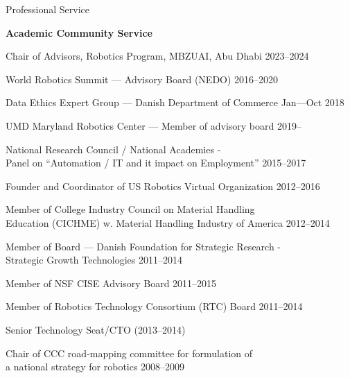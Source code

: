 \documentclass{article}
\newenvironment{sublist}{%
  \begin{list}{}{%
      \setlength{\itemsep}{0em}\setlength{\parsep}{0em}%
      \setlength{\topsep}{0em}\setlength{\parskip}{0em}%
    }%
}%
{ \end{list} }
\begin{document}
\begin{cv}


\begin{cvlist}{Professional Service}%
\item {\bf Academic Community Service}
  \begin{itemize}
    \item Chair of Advisors, Robotics Program, MBZUAI, Abu Dhabi
          \cftdotfill{\cftdotsep} 2023--2024
    \item World Robotics Summit --- Advisory Board (NEDO) \cftdotfill{\cftdotsep}
          2016--2020
    \item Data Ethics Expert Group --- Danish Department of Commerce
          \cftdotfill{\cftdotsep} Jan---Oct 2018
    \item UMD Maryland Robotics Center --- Member of advisory board
          \cftdotfill{\cftdotsep} 2019--
    \item National Research Council / National Academies -\\ Panel on ``Automation /
          IT and it impact on Employment'' \cftdotfill{\cftdotsep} 2015--2017
    \item Founder and Coordinator of US Robotics Virtual Organization
          \cftdotfill{\cftdotsep} 2012--2016
    \item Member of College Industry Council on Material Handling\\
          Education (CICHME) w. Material Handling Industry of America
          \cftdotfill{\cftdotsep} 2012--2014
    \item Member of Board --- Danish Foundation for Strategic Research -\\
          Strategic Growth Technologies \cftdotfill{\cftdotsep} 2011--2014
    \item Member of NSF CISE Advisory Board \cftdotfill{\cftdotsep} 2011--2015
    \item Member of Robotics Technology Consortium (RTC) Board
          \cftdotfill{\cftdotsep} 2011--2014
          \begin{sublist}
            \item Senior Technology Seat/CTO (2013--2014)
          \end{sublist}
    \item Chair of CCC road-mapping committee for formulation of \\
          a national strategy for robotics \cftdotfill{\cftdotsep} 2008--2009

\end{itemize}
\end{cvlist}
\end{cv}
\end{document}
